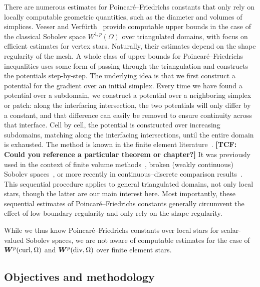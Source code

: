 \documentclass[10pt,a4paper]{article}
\newcommand{\todo}[1]{{\color{RedOrange}\textbf{#1}}}
\begin{document}
There are numerous estimates for Poincar\'e--Friedrichs constants that only rely on locally computable geometric quantities, such as the diameter and volumes of simplices. 
Veeser and Verf\"urth~\cite{veeser2012poincare} provide computable upper bounds in the case of the classical Sobolev space $W^{1,p}(\Omega)$ over triangulated domains, with focus on efficient estimates for vertex stars. Naturally, their estimates depend on the shape regularity of the mesh.
A whole class of upper bounds for Poincar\'e--Friedrichs inequalities uses some form of passing through the triangulation and constructs the potentials step-by-step. 
The underlying idea is that we first construct a potential for the gradient over an initial simplex. 
Every time we have found a potential over a subdomain, we construct a potential over a neighboring simplex or patch:
along the interfacing intersection, the two potentials will only differ by a constant, 
and that difference can easily be removed to ensure continuity across that interface. 
Cell by cell, the potential is constructed over increasing subdomains, matching along the interfacing intersections, until the entire domain is exhausted.  
The method is known in the finite element literature~\cite{ern2021finite}. \todo{[TCF: Could you reference a particular theorem or
chapter?]} It was previously used in the context of finite volume methods~\cite{Eym_Gal_Her_00}, broken (weakly continuous) Sobolev spaces~\cite{vohralik2005discrete}, or more recently in continuous--discrete comparison results~\cite{Brae_Pill_Sch_p_rob_09, ern2020stable, Chaum_Voh_p_rob_3D_H_curl_24,  Voh_loc_glob_H1_24}. 
This sequential procedure applies to general triangulated domains, not only local stars, though the latter are our main interest here. 
Most importantly, these sequential estimates of Poincar\'e--Friedrichs constants generally circumvent the effect of low boundary regularity and only rely on the shape regularity. 

While we thus know Poincar\'e--Friedrichs constants over local stars for scalar-valued Sobolev spaces, 
we are not aware of computable estimates for the case of $\bm{W}^{p}(\operatorname{curl},\Omega)$ and $\bm{W}^{p}(\operatorname{div},\Omega)$ over finite element stars. 






\subsection{Objectives and methodology}
\end{document}
